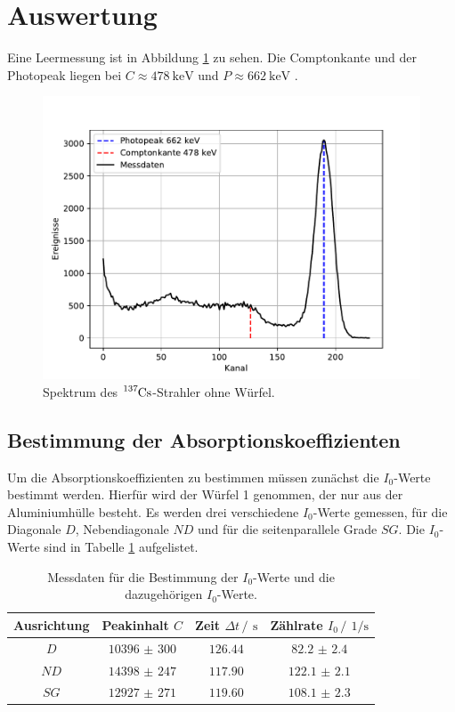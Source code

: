 \section{Auswertung}
\label{sec:Auswertung}
Eine Leermessung ist in Abbildung \ref{fig:Leer} zu sehen. Die Comptonkante und der Photopeak liegen bei $C\approx \SI{478}{\kilo\eV}$ und 
$P\approx\SI{662}{\kilo\eV}$ \cite{Lit_Wert_Comp}.
\begin{figure}
    \centering
    \includegraphics[]{figure/Leer.pdf}
    \caption{Spektrum des $\ce{^137Cs}$-Strahler ohne Würfel.}
    \label{fig:Leer}
\end{figure}
\subsection{Bestimmung der Absorptionskoeffizienten}
Um die Absorptionskoeffizienten zu bestimmen müssen zunächst die $I_0$-Werte bestimmt werden. 
Hierfür wird der Würfel 1 genommen, der nur aus der Aluminiumhülle besteht. Es werden drei 
verschiedene $I_0$-Werte gemessen, für die Diagonale $D$, Nebendiagonale $ND$ und für die seitenparallele Grade $SG$.
Die $I_0$-Werte sind in Tabelle \ref{tab:I_0} aufgelistet.
\FloatBarrier
\begin{table}
    \centering
    \caption{Messdaten für die Bestimmung der $I_0$-Werte und die dazugehörigen $I_0$-Werte.}
    \label{tab:I_0}
    \begin{tabular}{c c c c}
        \toprule
        Ausrichtung&Peakinhalt $C$&Zeit $\Delta t \,/\,\SI{}{\second}$&Zählrate $I_0 \,/\,\SI{}{1\per\second}$\\
        \midrule
        $D$ &$\num{10396(300)}$&$\num{126.44}$&$\num{82.2(24)}$\\
        $ND$&$\num{14398(247)}$&$\num{117.90}$&$\num{122.1(21)}$\\
        $SG$&$\num{12927(271)}$&$\num{119.60}$&$\num{108.1(23)}$\\
        \bottomrule
    \end{tabular}
\end{table}
\FloatBarrier

